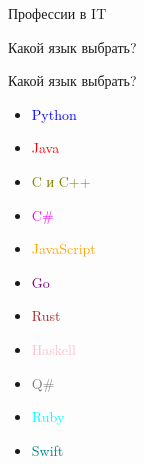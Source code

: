 \documentclass{beamer}
\begin{document}
\begin{section}{Профессии в IT}
    \begin{section}{Какой язык выбрать?}
        \begin{frame}{Какой язык выбрать?}
            \begin{itemize}
                \item \textcolor{blue}{Python} 
                \item \textcolor{red}{Java}
                \item \textcolor{olive}{C и C++}
                \item \textcolor{magenta}{C\#}
                \item \textcolor{orange}{JavaScript}
                \item \textcolor{purple}{Go}
                \item \textcolor{brown}{Rust}
                \item \textcolor{pink}{Haskell}
                \item \textcolor{gray}{Q\#}
                \item \textcolor{cyan}{Ruby}
                \item \textcolor{teal}{Swift}
            \end{itemize}
        \end{frame}
    \end{section}


\end{section}
\end{document}
